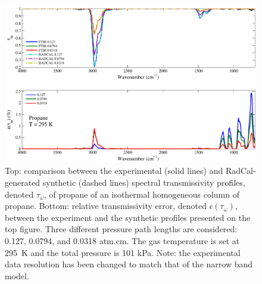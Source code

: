 \begin{figure}[h]
\includegraphics[width=\textwidth]{../Verification/Results_Test2/Propane_295.pdf}
\caption{Top: comparison between the experimental (solid lines) and RadCal-generated synthetic (dashed lines) spectral transmissivity profiles, denoted $\tau_{\omega}$, of propane of an isothermal homogeneous column of propane. Bottom: relative transmissivity error, denoted $\epsilon{(\tau_{\omega})}$, between the experiment and the synthetic profiles presented on the top figure. Three different pressure path lengths are considered: 0.127, 0.0794, and 0.0318 atm.cm. The gas temperature is set at 295~K and the total pressure is 101 kPa. Note: the experimental data resolution has been changed to match that of the narrow band model. \label{fig:propane_Verify_295K}}
\end{figure}

\newpage

